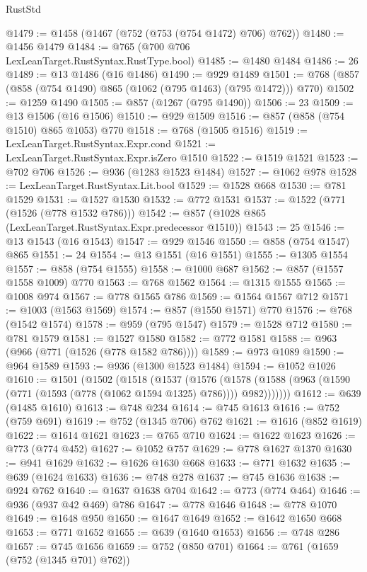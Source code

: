 \begin{lexlean}{RustStd}
\begin{coremodule}
@1479 := @1458 (@1467 (@752 (@753 (@754 @1472) @706) @762))
@1480 := @1456 @1479
@1484 := @765 (@700 @706 LexLeanTarget.RustSyntax.RustType.bool)
@1485 := @1480 @1484
@1486 := 26
@1489 := @13 @1486 (@16 @1486)
@1490 := @929 @1489
@1501 := @768 (@857 (@858 (@754 @1490) @865 (@1062 (@795 @1463) (@795 @1472))) @770)
@1502 := @1259 @1490
@1505 := @857 (@1267 (@795 @1490))
@1506 := 23
@1509 := @13 @1506 (@16 @1506)
@1510 := @929 @1509
@1516 := @857 (@858 (@754 @1510) @865 @1053) @770
@1518 := @768 (@1505 @1516)
@1519 := LexLeanTarget.RustSyntax.Expr.cond
@1521 := LexLeanTarget.RustSyntax.Expr.isZero @1510
@1522 := @1519 @1521
@1523 := @702 @706
@1526 := @936 (@1283 @1523 @1484)
@1527 := @1062 @978
@1528 := LexLeanTarget.RustSyntax.Lit.bool
@1529 := @1528 @668
@1530 := @781 @1529
@1531 := @1527 @1530
@1532 := @772 @1531
@1537 := @1522 (@771 (@1526 (@778 @1532 @786)))
@1542 := @857 (@1028 @865 (LexLeanTarget.RustSyntax.Expr.predecessor @1510))
@1543 := 25
@1546 := @13 @1543 (@16 @1543)
@1547 := @929 @1546
@1550 := @858 (@754 @1547) @865
@1551 := 24
@1554 := @13 @1551 (@16 @1551)
@1555 := @1305 @1554
@1557 := @858 (@754 @1555)
@1558 := @1000 @687
@1562 := @857 (@1557 @1558 @1009) @770
@1563 := @768 @1562
@1564 := @1315 @1555
@1565 := @1008 @974
@1567 := @778 @1565 @786
@1569 := @1564 @1567 @712
@1571 := @1003 (@1563 @1569)
@1574 := @857 (@1550 @1571) @770
@1576 := @768 (@1542 @1574)
@1578 := @959 (@795 @1547)
@1579 := @1528 @712
@1580 := @781 @1579
@1581 := @1527 @1580
@1582 := @772 @1581
@1588 := @963 (@966 (@771 (@1526 (@778 @1582 @786))))
@1589 := @973 @1089
@1590 := @964 @1589
@1593 := @936 (@1300 @1523 @1484)
@1594 := @1052 @1026
@1610 := @1501
    (@1502
      (@1518
        (@1537
          (@1576
            (@1578 (@1588 (@963 (@1590 (@771 (@1593 (@778 (@1062 @1594 @1325) @786)))) @982)))))))
@1612 := @639 (@1485 @1610)
@1613 := @748 @234
@1614 := @745 @1613
@1616 := @752 (@759 @691)
@1619 := @752 (@1345 @706) @762
@1621 := @1616 (@852 @1619)
@1622 := @1614 @1621
@1623 := @765 @710
@1624 := @1622 @1623
@1626 := @773 (@774 @452)
@1627 := @1052 @757
@1629 := @778 @1627 @1370
@1630 := @941 @1629
@1632 := @1626 @1630 @668
@1633 := @771 @1632
@1635 := @639 (@1624 @1633)
@1636 := @748 @278
@1637 := @745 @1636
@1638 := @924 @762
@1640 := @1637 @1638 @704
@1642 := @773 (@774 @464)
@1646 := @936 (@937 @42 @469) @786
@1647 := @778 @1646
@1648 := @778 @1070
@1649 := @1648 @950
@1650 := @1647 @1649
@1652 := @1642 @1650 @668
@1653 := @771 @1652
@1655 := @639 (@1640 @1653)
@1656 := @748 @286
@1657 := @745 @1656
@1659 := @752 (@850 @701)
@1664 := @761 (@1659 (@752 (@1345 @701) @762))

\end{coremodule}
\end{lexlean}
